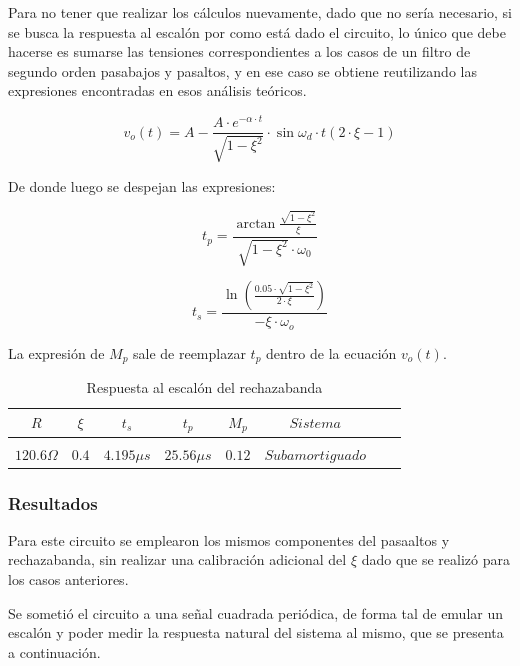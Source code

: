 Para no tener que realizar los c\'alculos nuevamente, dado que no ser\'ia necesario, si se busca la respuesta al escal\'on por como est\'a dado el circuito,
lo \'unico que debe hacerse es sumarse las tensiones correspondientes a los casos de un filtro de segundo orden pasabajos y pasaltos, y en ese caso se obtiene
reutilizando las expresiones encontradas en esos an\'alisis te\'oricos.

\begin{equation}
    v_o(t) = A - \frac{A \cdot e^{-\alpha \cdot t} }{\sqrt{1 - \xi^{2}}} \cdot \sin{\omega_d \cdot t} \left( 2 \cdot \xi -1 \right)
\end{equation}

De donde luego se despejan las expresiones:

\begin{equation}
    t_p = \frac{\arctan{\frac{\sqrt{1 - \xi^{2}}}{\xi}}}{\sqrt{1 - \xi^{2}} \cdot \omega_0}
\end{equation}

\begin{equation}
    t_s = \frac{ \ln{(\frac{0.05 \cdot \sqrt{1 - \xi^{2}}}{2 \cdot \xi})} }{- \xi \cdot \omega_o}
\end{equation}


La expresi\'on de $M_p$ sale de reemplazar $t_p$ dentro de la ecuaci\'on $v_o(t)$.

\begin{table}[H]
    \centering
    \begin{tabular}{c c c c c c c c}
        $R$ & $\xi$ & $t_s$ & $t_p$ & $M_p$ & $Sistema$ \\
        \hline \\
        $120.6 \Omega$ & $0.4$ & $4.195 \mu s$ & $25.56 \mu s$ & $0.12$ & $Subamortiguado$ \\
        \hline
    \end{tabular}
    \caption{Respuesta al escal\'on del rechazabanda}
    \label{tab:tabla_rechazabanda}
\end{table}

\subsubsection{Resultados}
Para este circuito se emplearon los mismos componentes del pasaaltos y rechazabanda, sin realizar una calibraci\'on adicional del $\xi$ dado que se realiz\'o para los casos anteriores.

Se someti\'o el circuito a una se\~nal cuadrada peri\'odica, de forma tal de emular un escal\'on y poder medir la respuesta natural del sistema al mismo, que se presenta a continuaci\'on.


